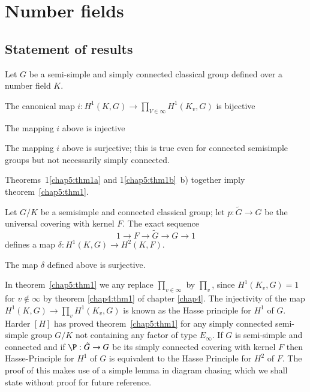 
 \chapter{Number fields}\label{chap5}
 

 \section{Statement of results}\label{chap5:sec5.1}\pageoriginale
 
 Let $G$ be a semi-simple and simply connected classical group defined
 over a number field $K$. 

 \setcounter{thm}{0}
 \begin{thm}\label{chap5:thm1}
The canonical map $i : H^1(K,G) \to \prod \limits_{V \in \infty}
H^1(K_v,G)$ is bijective 
 \end{thm} 
 
 \begin{thma}\label{chap5:thm1a}
The mapping $i$ above is injective
 \end{thma} 

  \begin{thma}\label{chap5:thm1b}
The mapping $i$ above is surjective; this is true even for connected
semisimple groups but not necessarily simply connected. 
 \end{thma} 
 
 \noindent
 Theorems~1\ref{chap5:thm1a} and 1\ref{chap5:thm1b}~b) together imply
 theorem~\ref{chap5:thm1}.

  
 Let $G/K$ be a semisimple and connected classical group; let $p:\tilde{G} \to
 G$ be the universal covering with kernel $F$. The exact sequence 
 $$
 1 \longrightarrow F \longrightarrow \tilde{G} \longrightarrow  G
 \longrightarrow  1 
 $$
 defines a map $\delta : H^1(K,G) \to H^2 (K,F)$.
 
 \begin{thm}\label{chap5:thm2}
 The map $\delta$ defined above is surjective.
 
 In theorem~\ref{chap5:thm1} we any replace $\prod\limits_{v \in  \infty}$ by
 $\prod\limits_{v}$, since $H^1(K_v,G)=1$ for $v \notin \infty$ by
 theorem \ref{chap4:thm1} of chapter \ref{chap4}. The injectivity of
 the map $H^1(K,G) \to 
 \prod\limits_v H^1(K_v,G)$ is known as the Hasse principle for $H^1$
 of $G$. Harder $[H]$ has proved theorem~\ref{chap5:thm1} for any
 simply connected 
 semi-simple group $G/K$ not containing any factor of type
 $E_\infty$. If $G$ is semi-simple and connected and if $\P :
 \tilde{G} \to G $ be its simply connected covering with kernel $F$
 then Hasse-Principle for $H^1$ of $G$ is equivalent to the Hasse
 Principle for $H^2$ of $F$. The proof of this makes use of a simple
 lemma in diagram chasing which we shall state without proof for
 future reference. 
 \end{thm}

